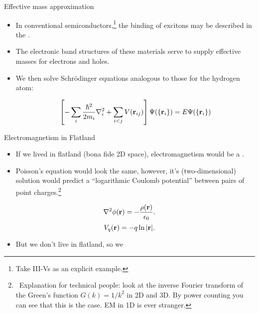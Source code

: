 \documentclass[12pt, pdf, hyperref={draft}, usenames, dvipsnames]{beamer}
\newcommand{\red}[1]{{\bf\color{LancsRed}{#1}}}
\newcommand{\blue}[1]{{\bf\color{NavyBlue}{#1}}}
\begin{document}
\begin{frame}{Effective mass approximation}

  \begin{itemize}

    \item In conventional semiconductors,\footnote{Take III-Vs as an explicit
    example.} the binding of excitons may be described in the \blue{effective mass
    approximation}.

    \item The electronic band structures of these materials serve
    to supply effective masses for electrons and holes.

    \item We then solve Schr\"{o}dinger equations analogous to those for the
    hydrogen atom:

    \begin{equation}
      \left[-\sum_i\dfrac{\hbar^2}{2m_i}\nabla^2_i + \sum_{i<j}V({\bf
      r}_{ij})\right]\Psi(\{{\bf r}_i\}) = E\Psi(\{{\bf r}_i\})
    \end{equation}

  \end{itemize}
\end{frame}



\begin{frame}{Electromagnetism in Flatland}
\begin{itemize}
  \item If we lived in flatland (bona fide 2D space), electromagnetism would
  be a \blue{very different beast}.
  \item Poisson's equation would look the same, however, it's (two-dimensional)
  solution would predict a ``logarithmic Coulomb potential'' between pairs of
  point charges.\footnote{\
  Explanation for technical people: look at the inverse Fourier transform of
  the Green's function $G({k})=1/k^2$ in 2D and 3D. By power counting you can
  see that this is the case. EM in 1D is ever stranger.}
\end{itemize}
\begin{equation}
  \nabla^2 \phi({\bf r}) = -\dfrac{\rho({\bf r})}{\epsilon_0}.
\end{equation}
\begin{equation}
  V_q({\bf r}) = -q\ln{\lvert {\bf r} \rvert}.
\end{equation}
\begin{itemize}
  \item But we don't live in flatland, so we \red{don't get this}
  \frownie\
\end{itemize}
\end{frame}
\end{document}
